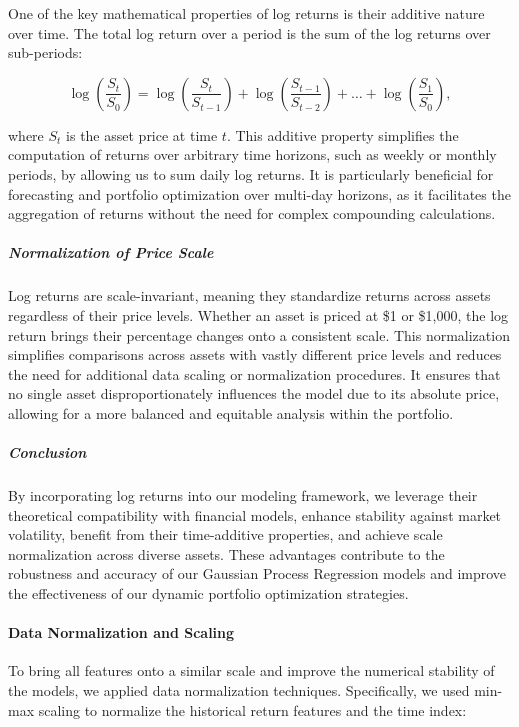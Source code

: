 One of the key mathematical properties of log returns is their additive nature over time. The total log return over a period is the sum of the log returns over sub-periods:

\begin{equation}
\log\left( \frac{S_t}{S_0} \right) = \log\left( \frac{S_t}{S_{t-1}} \right) + \log\left( \frac{S_{t-1}}{S_{t-2}} \right) + \dots + \log\left( \frac{S_1}{S_0} \right),
\end{equation}

where $S_t$ is the asset price at time $t$. This additive property simplifies the computation of returns over arbitrary time horizons, such as weekly or monthly periods, by allowing us to sum daily log returns. It is particularly beneficial for forecasting and portfolio optimization over multi-day horizons, as it facilitates the aggregation of returns without the need for complex compounding calculations.

\subparagraph{Normalization of Price Scale}

Log returns are scale-invariant, meaning they standardize returns across assets regardless of their price levels. Whether an asset is priced at \$1 or \$1,000, the log return brings their percentage changes onto a consistent scale. This normalization simplifies comparisons across assets with vastly different price levels and reduces the need for additional data scaling or normalization procedures. It ensures that no single asset disproportionately influences the model due to its absolute price, allowing for a more balanced and equitable analysis within the portfolio.

\subparagraph{Conclusion}

By incorporating log returns into our modeling framework, we leverage their theoretical compatibility with financial models, enhance stability against market volatility, benefit from their time-additive properties, and achieve scale normalization across diverse assets. These advantages contribute to the robustness and accuracy of our Gaussian Process Regression models and improve the effectiveness of our dynamic portfolio optimization strategies.



\paragraph{Data Normalization and Scaling}

To bring all features onto a similar scale and improve the numerical stability of the models, we applied data normalization techniques. Specifically, we used min-max scaling to normalize the historical return features and the time index:

